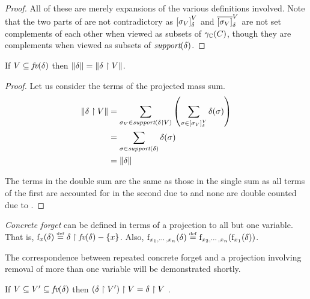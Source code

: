 \begin{proof} All of these are merely expansions of the various
definitions involved. Note that the two parts
of  are not contradictory as
$ \left[ \sigma_V \right]_{\delta}^{V} $ and $ \overline{\left[ \sigma_V \right]}_{\delta}^{V}
$ are not set complements of each other when viewed as subsets of
$ \gamma_{\mathbb{C}}(C{}) $, though they are complements when viewed as
subsets of $ \textit{support}(\delta) $.
\end{proof}

\begin{lemma}\label{thm:pp:project:mass} If $ V \subseteq \textit{fv}(\delta) $ then $ \mathord{\parallel}\delta\mathord{\parallel} = \mathord{\parallel}\delta \upharpoonright V\mathord{\parallel} $.
\end{lemma}

\begin{proof} Let us consider the terms of the projected mass sum.
\begin{align*}
\mathord{\parallel}\delta \upharpoonright V\mathord{\parallel} & = \sum_{\sigma_V \in \textit{support}(\delta \upharpoonright V)} \left( \sum_{\sigma \in \left[ \sigma_V \right]_{\delta}^{V}}\delta(\sigma) \right) \\
 & = \sum_{\sigma \in \textit{support}(\delta)} \delta (\sigma) \\ &
 = \mathord{\parallel}\delta\mathord{\parallel}
\end{align*}

The terms in the double sum are the same as those in the single sum as
all terms of the first are accounted for in the second due
to  and none are double counted due
to .
\end{proof}

\begin{definition} \emph{Concrete forget} can be defined in terms of a projection to
all but one variable. That is, $ \mathrm{f}_{x}(\delta)
\stackrel{\smash{\scriptscriptstyle \mathrm{def}}}= \delta \upharpoonright \textit{fv}(\delta) - \left\{ x \right\} $. Also,
$ \mathrm{f}_{x_1, \cdots, x_n}(\delta) \stackrel{\smash{\scriptscriptstyle \mathrm{def}}}= \mathrm{f}_{x_2, \cdots,
x_n}(\mathrm{f}_{x_1}(\delta)) $.
\end{definition}

The correspondence between repeated concrete forget and a projection
involving removal of more than one variable will be demonstrated shortly.

\begin{lemma}\label{thm:pp:project:order} If $ V \subseteq
V' \subseteq \textit{fv}(\delta) $ then
$ \left( \delta \upharpoonright V' \right) \upharpoonright V = \delta \upharpoonright V $ .
\end{lemma}

